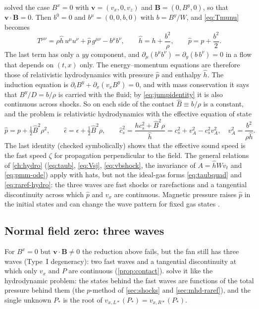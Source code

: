 \documentclass[11pt,a4paper,oneside,openany]{book}
\newcommand{\textcite}{\citet}
\newcommand{\parencite}{\citep}
\theoremstyle{definition}
\theoremstyle{plain}
\theoremstyle{remark}
\newcommand{\vv}{\bm{v}}
\newcommand{\BB}{\bm{B}}
\newcommand{\Ptot}{P}
\begin{document}
\textcite{Romero2005} solved the case $B^x=0$ with $\vv=(v_x,0,v_z)$ and $\BB=(0,B^y,0)$,
so that $\vv\cdot\BB=0$. Then $b^0=0$ and $b^\mu=(0,0,b,0)$ with $b=B^y/W$, and
\eqref{eq:Tmunu} becomes
\begin{equation}
T^{\mu\nu}=\rho\hat h\,u^\mu u^\nu+\hat p\,g^{\mu\nu}-b^\mu b^\nu,\qquad
\hat h=h+\frac{b^2}{\rho},\qquad \hat p=p+\frac{b^2}{2}.
\end{equation}
The last term has only a $yy$ component, and $\partial_\mu(b^\mu b^\nu)=\partial_y(b\,b^\nu)=0$
in a flow that depends on $(t,x)$ only. The energy--momentum equations are therefore those
of relativistic hydrodynamics with pressure $\hat p$ and enthalpy $\hat h$. The induction
equation is $\partial_tB^y+\partial_x(v_xB^y)=0$, and with mass conservation it says that
$B^y/D=b/\rho$ is carried with the fluid; by \eqref{eq:jumpidentity} it is also continuous
across shocks. So on each side of the contact $\hat B\equiv b/\rho$ is a constant, and the
problem is relativistic hydrodynamics with the effective equation of state
\parencite[Appendix~A]{Romero2005}
\begin{equation}\label{eq:romeroeos}
\hat p=p+\tfrac12\hat B^2\rho^2,\qquad
\hat\epsilon=\epsilon+\tfrac12\hat B^2\rho,\qquad
\hat c_s^2=\frac{hc_s^2+\hat B^2\rho}{\hat h}=c_s^2+v_A^2-c_s^2v_A^2,\quad
v_A^2=\frac{b^2}{\rho\hat h}.
\end{equation}
The last identity (checked symbolically) shows that the effective sound speed is the fast
speed $\zeta$ for propagation perpendicular to the field. The general relations of
\cref{ch:hydro} (\eqref{eq:taub}, \eqref{eq:Vsj}, \eqref{eq:vbshock}, the invariance of
$A=\hat hWv_t$ and \eqref{eq:pmm-ode}) apply with hats, but not the ideal-gas forms
\eqref{eq:taubquad} and \eqref{eq:raref-hydro}: the three waves are fast shocks or rarefactions and a tangential
discontinuity across which $\hat p$ and $v_x$ are continuous. Magnetic pressure raises
$\hat p$ in the initial states and can change the wave pattern for fixed gas states
\parencite{Romero2005}.

\subsection{Normal field zero: three waves}

For $B^x=0$ but $\vv\cdot\BB\ne0$ the reduction above fails, but the fan still has three
waves (Type~I degeneracy): two fast waves and a tangential discontinuity at which only
$v_x$ and $\Ptot$ are continuous (\cref{prop:contact}). \textcite{GiacomazzoRezzolla2006}
solve it like the hydrodynamic problem: the states behind the fast waves are functions of
the total pressure behind them (the $p$-method of \cref{sec:shocks} and
\cref{sec:mhd-raref}), and the single unknown $\Ptot_\ast$ is the root of
$v_{x,L\ast}(\Ptot_\ast)=v_{x,R\ast}(\Ptot_\ast)$.
\end{document}
